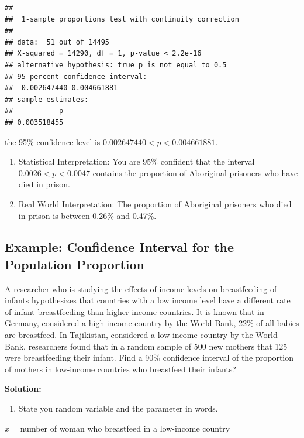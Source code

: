 \documentclass[
]{book}
\providecommand{\tightlist}{%
  \setlength{\itemsep}{0pt}\setlength{\parskip}{0pt}}
\begin{document}
\begin{verbatim}
## 
## 	1-sample proportions test with continuity correction
## 
## data:  51 out of 14495
## X-squared = 14290, df = 1, p-value < 2.2e-16
## alternative hypothesis: true p is not equal to 0.5
## 95 percent confidence interval:
##  0.002647440 0.004661881
## sample estimates:
##           p 
## 0.003518455
\end{verbatim}

the 95\% confidence level is \(0.002647440<p<0.004661881\).

\begin{enumerate}
\def\labelenumi{\arabic{enumi}.}
\setcounter{enumi}{3}
\item
  Statistical Interpretation: You are 95\% confident that the interval \(0.0026<p<0.0047\) contains the proportion of Aboriginal prisoners who have died in prison.
\item
  Real World Interpretation: The proportion of Aboriginal prisoners who died in prison is between 0.26\% and 0.47\%.
\end{enumerate}

\hypertarget{example-confidence-interval-for-the-population-proportion-1}{%
\subsection{Example: Confidence Interval for the Population Proportion}\label{example-confidence-interval-for-the-population-proportion-1}}

A researcher who is studying the effects of income levels on breastfeeding of infants hypothesizes that countries with a low income level have a different rate of infant breastfeeding than higher income countries. It is known that in Germany, considered a high-income country by the World Bank, 22\% of all babies are breastfeed. In Tajikistan, considered a low-income country by the World Bank, researchers found that in a random sample of 500 new mothers that 125 were breastfeeding their infant. Find a 90\% confidence interval of the proportion of mothers in low-income countries who breastfeed their infants?

\textbf{Solution:}

\begin{enumerate}
\def\labelenumi{\arabic{enumi}.}
\tightlist
\item
  State you random variable and the parameter in words.
\end{enumerate}

\emph{x} = number of woman who breastfeed in a low-income country
\end{document}
